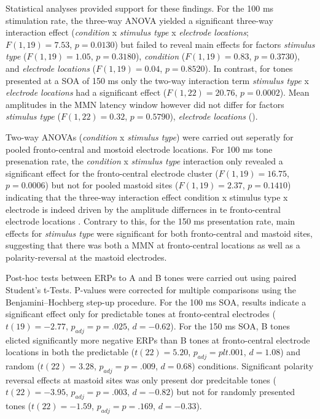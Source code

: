 \documentclass[stu,a4paper,11pt,floatsintext]{apa7}
\title{}
\author{}
\date{}
\begin{document}
\maketitle


\renewcommand*\contentsname{}

\setcounter{tocdepth}{3}
\tableofcontents

Statistical analyses provided support for these findings. For the 100 ms
stimulation rate, the three-way ANOVA yielded a significant three-way
interaction effect (\emph{condition} x \emph{stimulus type} x
\emph{electrode locations}; \(F(1,19) = 7.53\), \(p = 0.0130\)) but
failed to reveal main effects for factors \emph{stimulus type}
(\(F(1,19) = 1.05\), \(p = 0.3180\)), \emph{condition}
(\(F(1,19) = 0.83\), \(p = 0.3730\)), and \emph{electrode locations}
(\(F(1,19) = 0.04\), \(p = 0.8520\)). In contrast, for tones presented
at a SOA of 150 ms only the two-way interaction term \emph{stimulus
type} x \emph{electrode locations} had a significant effect
(\(F(1,22) = 20.76\), \(p = 0.0002\)). Mean amplitudes in the MMN
latency window however did not differ for factors \emph{stimulus type}
(\(F(1,22) = 0.32\), \(p = 0.5790\)), \emph{electrode locations} ().



Two-way ANOVAs (\emph{condition} x \emph{stimulus type}) were carried
out seperatly for pooled fronto-central and mostoid electrode locations.
For 100 ms tone presenation rate, the \emph{condition} x \emph{stimulus
type} interaction only revealed a significant effect for the
fronto-central electrode cluster (\(F(1,19) = 16.75\), \(p = 0.0006\))
but not for pooled mastoid sites (\(F(1,19) = 2.37\), \(p = 0.1410\))
indicating that the three-way interaction effect condition x stimulus
type x electrode is indeed driven by the amplitude differnces in te
fronto-central electrode locations . Contrary to this, for the 150 ms
presentation rate, main effects for \emph{stimulus type} were
significant for both fronto-central and mastoid sites, suggesting that
there was both a MMN at fronto-central locations as well as a
polarity-reversal at the mastoid electrodes.



Post-hoc tests between ERPs to A and B tones were carried out using
paired Student's t-Tests. P-values were corrected for multiple
comparisons using the Benjamini--Hochberg step-up procedure. For the 100
ms SOA, results indicate a significant effect only for predictable tones
at fronto-central electrodes (\(t(19) = -2.77\), \(p_{adj} = p = .025\),
\(d = -0.62\)). For the 150 ms SOA, B tones elicted significantly more
negative ERPs than B tones at fronto-central electrode locations in both
the predictable (\(t(22) = 5.20\), \(p_{adj} = p lt .001\),
\(d = 1.08\)) and random (\(t(22) = 3.28\), \(p_{adj} = p = .009\),
\(d = 0.68\)) conditions. Significant polarity reversal effects at
mastoid sites was only present dor predcitable tones (\(t(22) = -3.95\),
\(p_{adj} = p = .003\), \(d = -0.82\)) but not for randomly presented
tones (\(t(22) = -1.59\), \(p_{adj} = p = .169\), \(d = -0.33\)).
\end{document}
